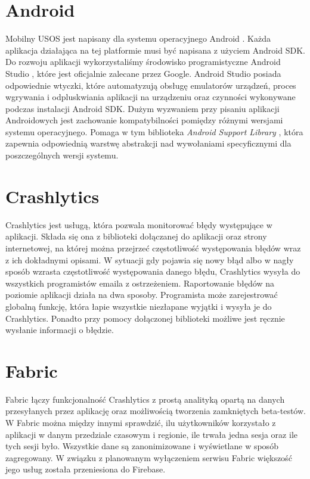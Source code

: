 \documentclass{pracamgr}
\begin{document}
\section{Android}

Mobilny USOS jest napisany dla systemu operacyjnego Android \cite{android}.
Każda aplikacja działająca na tej platformie musi być napisana z użyciem Android
SDK. Do rozwoju aplikacji wykorzystaliśmy środowisko programistyczne Android Studio
\cite{androidstudio}, które jest oficjalnie zalecane przez Google. Android Studio
posiada odpowiednie wtyczki, które automatyzują obsługę emulatorów urządzeń, proces
wgrywania i odpluskwiania aplikacji na urządzeniu oraz czynności wykonywane podczas
instalacji Android SDK. Dużym wyzwaniem przy pisaniu aplikacji Androidowych jest
zachowanie kompatybilności pomiędzy różnymi wersjami systemu operacyjnego. Pomaga
w tym biblioteka \textit{Android Support Library} \cite{androidsupportlibrary},
która zapewnia odpowiednią warstwę abstrakcji nad wywołaniami specyficznymi dla
poszczególnych wersji systemu.

\section{Crashlytics}

Crashlytics \cite{crashlytics} jest usługą, która pozwala monitorować błędy
występujące w aplikacji. Składa się ona z biblioteki dołączanej do aplikacji
oraz strony internetowej, na której można przejrzeć częstotliwość występowania
błędów wraz z ich dokładnymi opisami. W sytuacji gdy pojawia się nowy błąd albo
w nagły sposób wzrasta częstotliwość występowania danego błędu, Crashlytics wysyła
do wszystkich programistów emaila z ostrzeżeniem. Raportowanie błędów na poziomie
aplikacji działa na dwa sposoby. Programista może zarejestrować globalną funkcję,
która łapie wszystkie niezłapane wyjątki i wysyła je do Crashlytics. Ponadto przy
pomocy dołączonej biblioteki możliwe jest ręcznie wysłanie informacji o błędzie.

\section{Fabric}

Fabric \cite{fabric} łączy funkcjonalność Crashlytics z prostą analityką opartą na
danych przesyłanych przez aplikację oraz możliwością tworzenia zamkniętych
beta-testów. W Fabric można między innymi sprawdzić, ilu użytkowników korzystało
z aplikacji w danym przedziale czasowym i regionie, ile trwała jedna sesja oraz
ile tych sesji było. Wszystkie dane są zanonimizowane i wyświetlane w sposób
zagregowany. W związku z planowanym wyłączeniem serwisu Fabric większość jego
usług została przeniesiona do Firebase.
\end{document}
